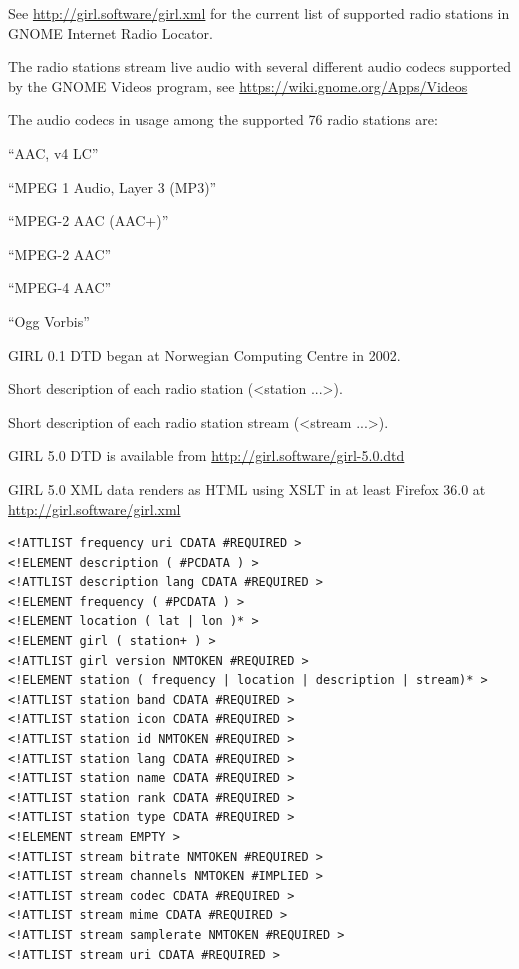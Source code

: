 \documentclass[20pt,landscape]{foils}
\begin{document}
See \url{http://girl.software/girl.xml} for the current list of supported
radio stations in GNOME Internet Radio Locator.


The radio stations stream live audio with several different audio codecs supported by the GNOME Videos program, see \url{https://wiki.gnome.org/Apps/Videos}

The audio codecs in usage among the supported 76 radio stations are:

\begin{list1}
  \item
    \begin{list2}
    \item ``AAC, v4 LC''
    \item ``MPEG 1 Audio, Layer 3 (MP3)''
    \item ``MPEG-2 AAC (AAC+)''
    \item ``MPEG-2 AAC''
    \item ``MPEG-4 AAC''
    \item ``Ogg Vorbis''
    \end{list2}
\end{list1}


\begin{list1}
\item GIRL 0.1 DTD began at Norwegian Computing Centre in 2002.
\item Short description of each radio station (<station ...>).
\item Short description of each radio station stream (<stream ...>).
\item GIRL 5.0 DTD is available from \url{http://girl.software/girl-5.0.dtd}
\item GIRL 5.0 XML data renders as HTML using XSLT in at least Firefox 36.0 at \url{http://girl.software/girl.xml}
\end{list1}



\begin{tiny}
\begin{verbatim}
<!ATTLIST frequency uri CDATA #REQUIRED >
<!ELEMENT description ( #PCDATA ) >
<!ATTLIST description lang CDATA #REQUIRED >
<!ELEMENT frequency ( #PCDATA ) >
<!ELEMENT location ( lat | lon )* >
<!ELEMENT girl ( station+ ) >
<!ATTLIST girl version NMTOKEN #REQUIRED >
<!ELEMENT station ( frequency | location | description | stream)* >
<!ATTLIST station band CDATA #REQUIRED >
<!ATTLIST station icon CDATA #REQUIRED >
<!ATTLIST station id NMTOKEN #REQUIRED >
<!ATTLIST station lang CDATA #REQUIRED >
<!ATTLIST station name CDATA #REQUIRED >
<!ATTLIST station rank CDATA #REQUIRED >
<!ATTLIST station type CDATA #REQUIRED >
<!ELEMENT stream EMPTY >
<!ATTLIST stream bitrate NMTOKEN #REQUIRED >
<!ATTLIST stream channels NMTOKEN #IMPLIED >
<!ATTLIST stream codec CDATA #REQUIRED >
<!ATTLIST stream mime CDATA #REQUIRED >
<!ATTLIST stream samplerate NMTOKEN #REQUIRED >
<!ATTLIST stream uri CDATA #REQUIRED >
\end{verbatim}
\end{tiny}
\end{document}
